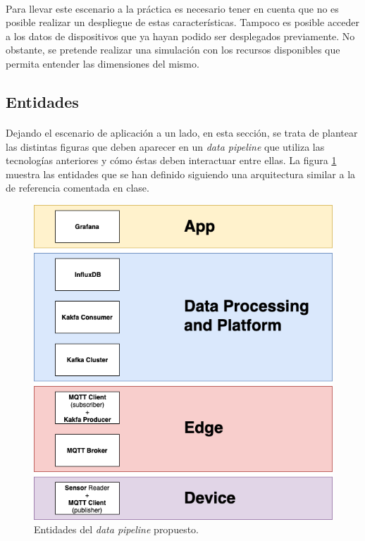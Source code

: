 \documentclass[12pt, a4paper]{article}
\begin{document}
        \paragraph{}
        Para llevar este escenario a la práctica es necesario tener en cuenta que no es posible realizar un despliegue de estas características. Tampoco es posible acceder a los datos de dispositivos que ya hayan podido ser desplegados previamente. No obstante, se pretende realizar una simulación con los recursos disponibles que permita entender las dimensiones del mismo.

        \subsection{Entidades}

        \paragraph{}
        Dejando el escenario de aplicación a un lado, en esta sección, se trata de plantear las distintas figuras que deben aparecer en un \textit{data pipeline} que utiliza las tecnologías anteriores y cómo éstas deben interactuar entre ellas. La figura \ref{fig-design} muestra las entidades que se han definido siguiendo una arquitectura similar a la de referencia comentada en clase.

        \begin{figure}[ht]
            \centerline{\includegraphics[width=0.6\paperwidth]{design}}
            \caption{Entidades del \textit{data pipeline} propuesto.}
            \label{fig-design}
        \end{figure}
\end{document}
